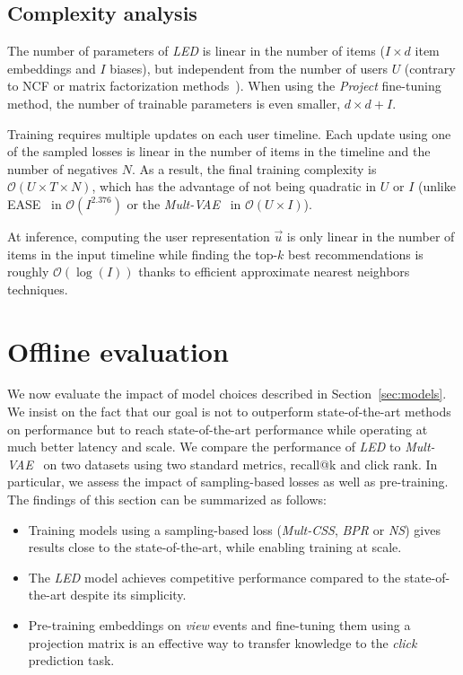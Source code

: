 \documentclass[sigconf]{acmart}
\begin{document}
\subsection{Complexity analysis}

The number of parameters of \emph{LED} is linear in the number of items ($ I \times d $ item embeddings and $ I $ biases), but independent from the number of users $ U $ (contrary to NCF\cite{ncf-www-2017} or matrix factorization methods~\cite{wmf}). When using the \emph{Project} fine-tuning method, the number of trainable parameters is even smaller, $ d \times d + I $.

Training requires multiple updates on each user timeline. Each update using one of the sampled losses is linear in the number of items in the timeline and the number of negatives $ N $. As a result, the final training complexity is $ \mathcal{O}\left(U \times T \times N \right) $, which has the advantage of not being quadratic in $ U $ or $ I $ (unlike EASE~\cite{ease-vae} in $ \mathcal{O}(I^{2.376}) $ or the \emph{Mult-VAE}~\cite{variational-liang-2018} in $ \mathcal{O}(U \times I) $). 



At inference, computing the user representation $ \overrightarrow{u} $ is only linear in the number of items in the input timeline while finding the top-$k$ best recommendations is roughly $ \mathcal{O}(\log(I)) $ thanks to efficient approximate nearest neighbors techniques.

\section{Offline evaluation}
\label{sec:offline-evaluation}
We now evaluate the impact of model choices described in Section~\ref{sec:models}. We insist on the fact that our goal is not to outperform state-of-the-art methods on performance but to reach state-of-the-art performance while operating at much better latency and scale. We compare the performance of \emph{LED} to \emph{Mult-VAE}~\cite{variational-liang-2018} on two datasets using two standard metrics, recall@k and click rank. In particular, we assess the impact of sampling-based losses as well as pre-training. The findings of this section can be summarized as follows:

\begin{itemize}
    \item Training models using a sampling-based loss (\emph{Mult-CSS}\cite{pmlr-v54-botev17a}, \emph{BPR}\cite{bpr} or \emph{NS}\cite{NIPS2013_5021}) gives results close to the state-of-the-art, while enabling training at scale.
    \item The \emph{LED} model achieves competitive performance compared to the state-of-the-art despite its simplicity.
    \item Pre-training embeddings on \emph{view} events and fine-tuning them using a projection matrix is an effective way to transfer knowledge to the \emph{click} prediction task.
\end{itemize}
\end{document}
